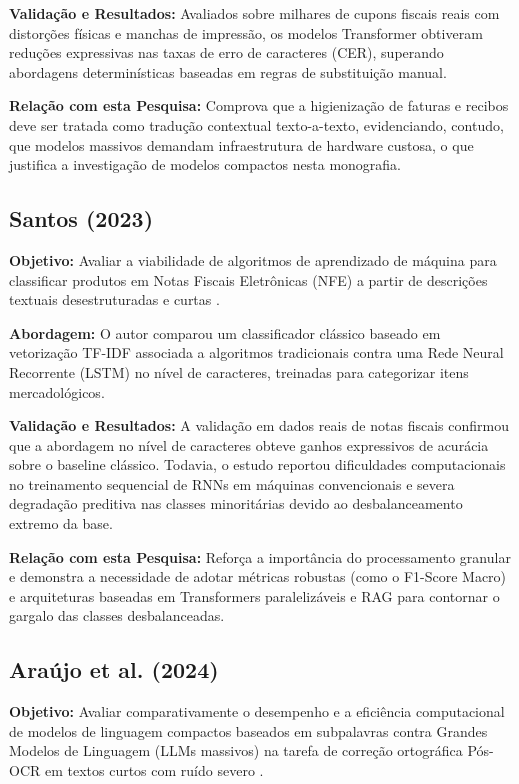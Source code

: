 \documentclass[
	12pt,				
	openright,			
	oneside,			
	a4paper,			
	english,			
	brazil				
	]{abntex2}
\begin{document}
\textbf{Validação e Resultados:} Avaliados sobre milhares de cupons fiscais reais com distorções físicas e manchas de impressão, os modelos Transformer obtiveram reduções expressivas nas taxas de erro de caracteres (CER), superando abordagens determinísticas baseadas em regras de substituição manual.

\textbf{Relação com esta Pesquisa:} Comprova que a higienização de faturas e recibos deve ser tratada como tradução contextual texto-a-texto, evidenciando, contudo, que modelos massivos demandam infraestrutura de hardware custosa, o que justifica a investigação de modelos compactos nesta monografia.

\subsection{Santos (2023)}
\textbf{Objetivo:} Avaliar a viabilidade de algoritmos de aprendizado de máquina para classificar produtos em Notas Fiscais Eletrônicas (NFE) a partir de descrições textuais desestruturadas e curtas \cite{santos2023classificacao}.

\textbf{Abordagem:} O autor comparou um classificador clássico baseado em vetorização TF-IDF associada a algoritmos tradicionais contra uma Rede Neural Recorrente (LSTM) no nível de caracteres, treinadas para categorizar itens mercadológicos.

\textbf{Validação e Resultados:} A validação em dados reais de notas fiscais confirmou que a abordagem no nível de caracteres obteve ganhos expressivos de acurácia sobre o baseline clássico. Todavia, o estudo reportou dificuldades computacionais no treinamento sequencial de RNNs em máquinas convencionais e severa degradação preditiva nas classes minoritárias devido ao desbalanceamento extremo da base.

\textbf{Relação com esta Pesquisa:} Reforça a importância do processamento granular e demonstra a necessidade de adotar métricas robustas (como o F1-Score Macro) e arquiteturas baseadas em Transformers paralelizáveis e RAG para contornar o gargalo das classes desbalanceadas.

\subsection{Araújo et al. (2024)}
\textbf{Objetivo:} Avaliar comparativamente o desempenho e a eficiência computacional de modelos de linguagem compactos baseados em subpalavras contra Grandes Modelos de Linguagem (LLMs massivos) na tarefa de correção ortográfica Pós-OCR em textos curtos com ruído severo \cite{araujo2024saneamento}.
\end{document}

